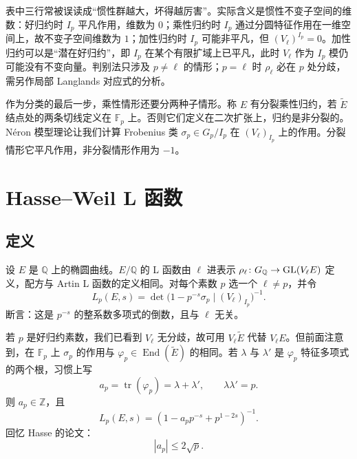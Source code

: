 \begin{annote}
表中三行常被误读成“惯性群越大，坏得越厉害”。实际含义是惯性不变子空间的维数：好归约时 $I_p$ 平凡作用，维数为 $0$；乘性归约时 $I_p$ 通过分圆特征作用在一维空间上，故不变子空间维数为 $1$；加性归约时 $I_p$ 可能非平凡，但 $(V_\ell)^{I_p}=0$。加性归约可以是“潜在好归约”，即 $I_p$ 在某个有限扩域上已平凡，此时 $V_\ell$ 作为 $I_p$ 模仍可能没有不变向量。判别法只涉及 $p\neq\ell$ 的情形；$p=\ell$ 时 $\rho_\ell$ 必在 $p$ 处分歧，需另作局部 Langlands 对应式的分析。
\par\vspace{0.15em}{\raggedleft 【来源：Silverman《The Arithmetic of Elliptic Curves》第 VII 章（A）；Serre--Tate《Good reduction of abelian varieties》（A）；nLab 条目“Néron model”（B，与 A 交叉核对）】\par}
\end{annote}

作为分类的最后一步，乘性情形还要分两种子情形。称 $E$ 有分裂乘性归约，若 $\tilde{E}$ 结点处的两条切线定义在 $\mathbb{F}_p$ 上。否则它们定义在二次扩张上，归约是非分裂的。Néron 模型理论让我们计算 Frobenius 类 $\sigma_p\in G_p/I_p$ 在 $(V_\ell)_{I_p}$ 上的作用。分裂情形它平凡作用，非分裂情形作用为 $-1$。

\section{Hasse--Weil L 函数}\label{c5:sec:3}

\subsection{定义}\label{c5:sec:3.1}

设 $E$ 是 $\mathbb{Q}$ 上的椭圆曲线。$E/\mathbb{Q}$ 的 L 函数由 $\ell$ 进表示 $\rho_\ell\colon G_{\mathbb{Q}}\to\mathrm{GL}(V_\ell E)$ 定义，配方与 Artin L 函数的定义相同。对每个素数 $p$ 选一个 $\ell\neq p$，并令
\begin{equation}\tag{3.1}\label{c5:eq:3.1}
L_p(E,s)=\det\bigl(1-p^{-s}\sigma_p\mid(V_\ell)_{I_p}\bigr)^{-1}.
\end{equation}
断言：这是 $p^{-s}$ 的整系数多项式的倒数，且与 $\ell$ 无关。

若 $p$ 是好归约素数，我们已看到 $V_\ell$ 无分歧，故可用 $V_\ell\tilde{E}$ 代替 $V_\ell E$。但前面注意到，在 $\mathbb{F}_p$ 上 $\sigma_p$ 的作用与 $\varphi_p\in\operatorname{End}(\tilde{E})$ 的相同。若 $\lambda$ 与 $\lambda'$ 是 $\varphi_p$ 特征多项式的两个根，习惯上写
\begin{equation}\tag{3.2}\label{c5:eq:3.2}
a_p=\operatorname{tr}(\varphi_p)=\lambda+\lambda',\qquad \lambda\lambda'=p.
\end{equation}
则 $a_p\in\mathbb{Z}$，且
\begin{equation}\tag{3.3}\label{c5:eq:3.3}
L_p(E,s)=(1-a_pp^{-s}+p^{1-2s})^{-1}.
\end{equation}
回忆 Hasse 的论文：
\begin{equation}\tag{3.4}\label{c5:eq:3.4}
|a_p|\le 2\sqrt{p}.
\end{equation}


